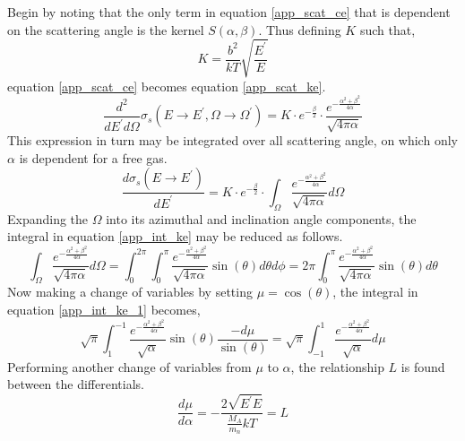 Begin by noting that the only term in equation \ref{app_scat_ce} that is dependent on the 
scattering angle is the kernel $S(\alpha, \beta)$.  Thus defining $K$ such that, 
\begin{equation}
\label{app_big_k}
K = \frac{b^2}{kT} \sqrt{\frac{E^{\prime}}{E}}
\end{equation}
equation \ref{app_scat_ce} becomes equation \ref{app_scat_ke}.
\begin{equation}
\label{app_scat_ke}
\frac{d^2}{dE^\prime d\Omega} \sigma_s(E\to E^\prime, \Omega\to\Omega^\prime) = K \cdot
                e^{-\frac{\beta}{2}} \cdot
                \frac{e^{-\frac{\alpha^2 + \beta^2}{4\alpha}}}{\sqrt{4\pi\alpha}}
\end{equation}
This expression in turn may be integrated over all scattering angle, on which only $\alpha$ 
is dependent for a free gas.
\begin{equation}
\label{app_int_ke}
\frac{d\sigma_s(E\to E^\prime)}{dE^\prime} = K \cdot
                e^{-\frac{\beta}{2}} \cdot
                \int_\Omega \frac{e^{-\frac{\alpha^2 + \beta^2}{4\alpha}}}{\sqrt{4\pi\alpha}} d\Omega
\end{equation}
Expanding the $\Omega$ into its azimuthal and inclination angle components, the integral in 
equation \ref{app_int_ke} may be reduced as follows.
\begin{equation}
\label{app_int_ke_1}
\int_\Omega \frac{e^{-\frac{\alpha^2 + \beta^2}{4\alpha}}}{\sqrt{4\pi\alpha}} d\Omega = 
    \int_0^{2\pi} \int_0^\pi \frac{e^{-\frac{\alpha^2 + \beta^2}{4\alpha}}}{\sqrt{4\pi\alpha}} \sin(\theta) d\theta d\phi = 
    2\pi \int_0^\pi \frac{e^{-\frac{\alpha^2 + \beta^2}{4\alpha}}}{\sqrt{4\pi\alpha}} \sin(\theta) d\theta
\end{equation}
Now making a change of variables by setting $\mu=\cos(\theta)$, the integral in equation \ref{app_int_ke_1}
becomes, 
\begin{equation}
\label{app_int_ke_2}
\sqrt{\pi} \int_1^{-1} \frac{e^{-\frac{\alpha^2 + \beta^2}{4\alpha}}}{\sqrt{\alpha}} \sin(\theta) \frac{-d\mu}{\sin(\theta)} = 
                \sqrt{\pi} \int_{-1}^1 \frac{e^{-\frac{\alpha^2 + \beta^2}{4\alpha}}}{\sqrt{\alpha}} d\mu
\end{equation}
Performing another change of variables from $\mu$ to $\alpha$, the relationship $L$ is found between
the differentials.
\begin{equation}
\label{app_dmu_dalpha}
\frac{d\mu}{d\alpha} = - \frac{2\sqrt{E^\prime E}}{\frac{M_A}{m_n}kT} = L
\end{equation}
